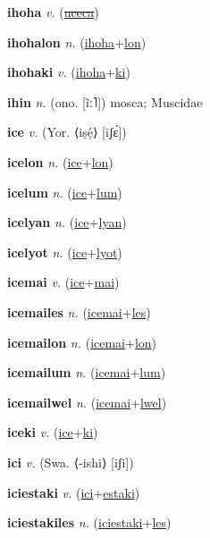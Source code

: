 \textbf{\hypertarget{ihoha}{ihoha}} \textit{v.} (\hyperlink{uceca}{\sout{uceca}})


\textbf{\hypertarget{ihohalon}{ihohalon}} \textit{n.} (\hyperlink{ihoha}{ihoha}+\allowbreak \hyperlink{lon}{lon})


\textbf{\hypertarget{ihohaki}{ihohaki}} \textit{v.} (\hyperlink{ihoha}{ihoha}+\allowbreak \hyperlink{ki}{ki})


\textbf{\hypertarget{ihin}{ihin}} \textit{n.} (ono. [ĩː˥])
mosca; Muscidae

\textbf{\hypertarget{ice}{ice}} \textit{v.} (Yor. ⟨iṣẹ́⟩ [īʃɛ́])


\textbf{\hypertarget{icelon}{icelon}} \textit{n.} (\hyperlink{ice}{ice}+\allowbreak \hyperlink{lon}{lon})


\textbf{\hypertarget{icelum}{icelum}} \textit{n.} (\hyperlink{ice}{ice}+\allowbreak \hyperlink{lum}{lum})


\textbf{\hypertarget{icelyan}{icelyan}} \textit{n.} (\hyperlink{ice}{ice}+\allowbreak \hyperlink{lyan}{lyan})


\textbf{\hypertarget{icelyot}{icelyot}} \textit{n.} (\hyperlink{ice}{ice}+\allowbreak \hyperlink{lyot}{lyot})


\textbf{\hypertarget{icemai}{icemai}} \textit{v.} (\hyperlink{ice}{ice}+\allowbreak \hyperlink{mai}{mai})


\textbf{\hypertarget{icemailes}{icemailes}} \textit{n.} (\hyperlink{icemai}{icemai}+\allowbreak \hyperlink{les}{les})


\textbf{\hypertarget{icemailon}{icemailon}} \textit{n.} (\hyperlink{icemai}{icemai}+\allowbreak \hyperlink{lon}{lon})


\textbf{\hypertarget{icemailum}{icemailum}} \textit{n.} (\hyperlink{icemai}{icemai}+\allowbreak \hyperlink{lum}{lum})


\textbf{\hypertarget{icemailwel}{icemailwel}} \textit{n.} (\hyperlink{icemai}{icemai}+\allowbreak \hyperlink{lwel}{lwel})


\textbf{\hypertarget{iceki}{iceki}} \textit{v.} (\hyperlink{ice}{ice}+\allowbreak \hyperlink{ki}{ki})


\textbf{\hypertarget{ici}{ici}} \textit{v.} (Swa. ⟨-ishi⟩ [iʃi])


\textbf{\hypertarget{iciestaki}{iciestaki}} \textit{v.} (\hyperlink{ici}{ici}+\allowbreak \hyperlink{estaki}{estaki})


\textbf{\hypertarget{iciestakiles}{iciestakiles}} \textit{n.} (\hyperlink{iciestaki}{iciestaki}+\allowbreak \hyperlink{les}{les})


